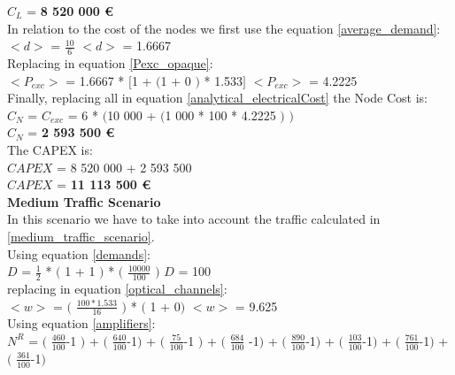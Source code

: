 $C_L$ = \textbf{8 520 000 \euro}\\

In relation to the cost of the nodes we first use the equation \ref{average_demand}:\\

$<d>$ = $\frac{10}{6}$ \qquad \qquad $<d>$ = 1.6667\\

Replacing in equation \ref{Pexc_opaque}:\\

$<P_{exc}>$ = 1.6667 * $[$1 + $($1 + $0$ $)$ * 1.533$]$ \qquad \quad $<P_{exc}>$ = 4.2225 \\

Finally, replacing all in equation \ref{analytical_electricalCost} the Node Cost is:\\

$C_N$ = $C_{exc}$ = 6 * $($10 000 + $($1 000 * 100 * 4.2225 $)$ $)$\\

$C_N$ = \textbf{2 593 500 \euro}\\

The CAPEX is:\\
$CAPEX$ = 8 520 000 + 2 593 500\\

$CAPEX$ = \textbf{11 113 500 \euro}\\

\textbf{Medium Traffic Scenario}\\
In this scenario we have to take into account the traffic calculated in \ref{medium_traffic_scenario}.\\

Using equation \ref{demands}:\\

$D$ = $\frac{1}{2}$ * $($ 1 + 1 $)$ * $($ $\frac{10 000}{100}$ $)$ \qquad \qquad $D$ = 100\\

replacing in equation \ref{optical_channels}:\\

$<w>$ = $($ $\frac{100 * 1.533}{16}$ $)$ * $($ 1 + 0$)$ \qquad \quad $<w>$ = 9.625\\

Using equation \ref{amplifiers}:\\

$N^R$ = $($ $\frac{460}{100}$-1 $)$ + $($ $\frac{640}{100}$-1$)$ + $($ $\frac{75}{100}$-1 $)$ + $($ $\frac{684}{100}$ -1$)$ + $($ $\frac{890}{100}$-1$)$ + $($ $\frac{103}{100}$-1$)$ + $($ $\frac{761}{100}$-1$)$ + $($ $\frac{361}{100}$-1$)$\\

